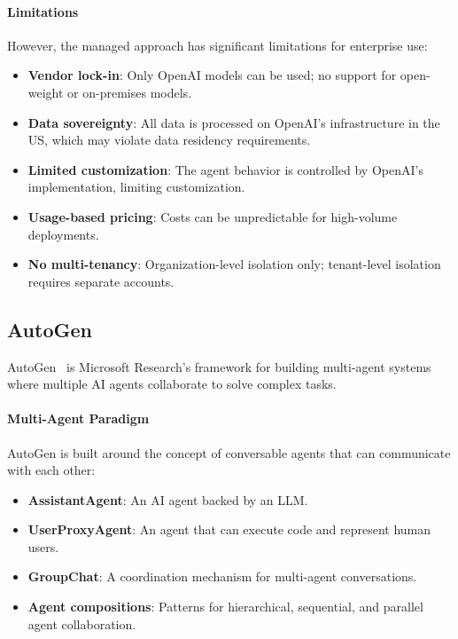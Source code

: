 \paragraph{Limitations}
However, the managed approach has significant limitations for enterprise use:
\begin{itemize}
    \item \textbf{Vendor lock-in}: Only OpenAI models can be used; no support for open-weight or on-premises models.
    \item \textbf{Data sovereignty}: All data is processed on OpenAI's infrastructure in the US, which may violate data residency requirements.
    \item \textbf{Limited customization}: The agent behavior is controlled by OpenAI's implementation, limiting customization.
    \item \textbf{Usage-based pricing}: Costs can be unpredictable for high-volume deployments.
    \item \textbf{No multi-tenancy}: Organization-level isolation only; tenant-level isolation requires separate accounts.
\end{itemize}

\subsection{AutoGen}

AutoGen~%
is Microsoft Research's framework for building multi-agent systems where multiple AI agents collaborate to solve complex tasks.

\paragraph{Multi-Agent Paradigm}
AutoGen is built around the concept of conversable agents that can communicate with each other:
\begin{itemize}
    \item \textbf{AssistantAgent}: An AI agent backed by an LLM.
    \item \textbf{UserProxyAgent}: An agent that can execute code and represent human users.
    \item \textbf{GroupChat}: A coordination mechanism for multi-agent conversations.
    \item \textbf{Agent compositions}: Patterns for hierarchical, sequential, and parallel agent collaboration.
\end{itemize}

